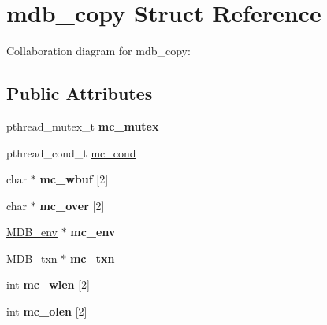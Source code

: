 \hypertarget{structmdb__copy}{}\section{mdb\+\_\+copy Struct Reference}
\label{structmdb__copy}


Collaboration diagram for mdb\+\_\+copy\+:
\subsection*{Public Attributes}
\begin{DoxyCompactItemize}
\item 
\mbox{\label{structmdb__copy_a540d0c0ed25e9dd2caf456d1cae7c61e}} 
pthread\+\_\+mutex\+\_\+t {\bfseries mc\+\_\+mutex}
\item 
pthread\+\_\+cond\+\_\+t \mbox{\hyperlink{structmdb__copy_ac5841d54d99b78b4dde87d043a232224}{mc\+\_\+cond}}
\item 
\mbox{\label{structmdb__copy_a9006957fe0385ca8763971d160777784}} 
char $\ast$ {\bfseries mc\+\_\+wbuf} \mbox{[}2\mbox{]}
\item 
\mbox{\label{structmdb__copy_ad53247499593374fa16eec8a5fc71d5d}} 
char $\ast$ {\bfseries mc\+\_\+over} \mbox{[}2\mbox{]}
\item 
\mbox{\label{structmdb__copy_a95da466b3fb9559738c5b7ce2b9fa5d9}} 
\mbox{\hyperlink{struct_m_d_b__env}{M\+D\+B\+\_\+env}} $\ast$ {\bfseries mc\+\_\+env}
\item 
\mbox{\label{structmdb__copy_a094eb7bac9746c525bb7dffa50c7c950}} 
\mbox{\hyperlink{struct_m_d_b__txn}{M\+D\+B\+\_\+txn}} $\ast$ {\bfseries mc\+\_\+txn}
\item 
\mbox{\label{structmdb__copy_af976e1d6a0fd312c0682223cb29077b2}} 
int {\bfseries mc\+\_\+wlen} \mbox{[}2\mbox{]}
\item 
\mbox{\label{structmdb__copy_aca167759205051eed5a2f81bf52286b8}} 
int {\bfseries mc\+\_\+olen} \mbox{[}2\mbox{]}
\item 
\mbox{\label{structmdb__copy_a0811993b00ad7b94d27e7fadd23cafbc}} 

\end{DoxyCompactItemize}
